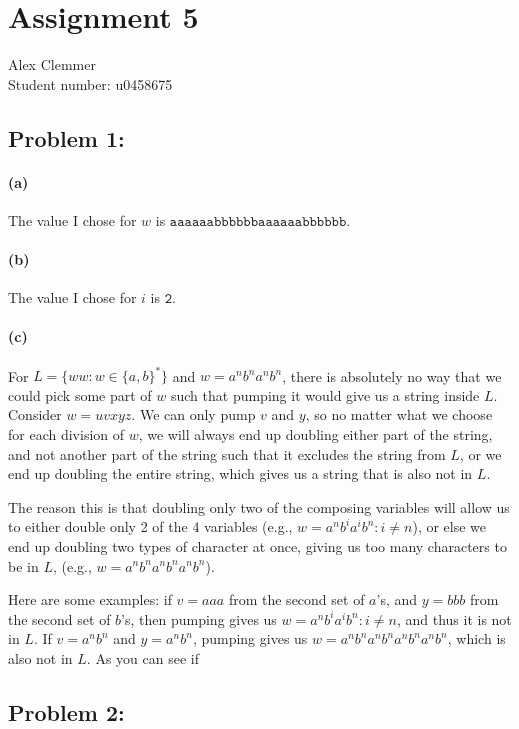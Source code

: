 \documentclass[a4paper]{article}
\begin{document}
\section*{Assignment 5}
Alex Clemmer\\
Student number: u0458675

\subsection*{Problem 1:} 

\paragraph{(a)} The value I chose for $w$ is $\texttt{aaaaaabbbbbbaaaaaabbbbbb}$.

\paragraph{(b)} The value I chose for $i$ is $\texttt{2}$.

\paragraph{(c)} For $L= \{ww : w \in \{a,b\}^*\}$ and $w = a^n b^n a^n b^n$, there is absolutely no way that we could pick some part of $w$ such that pumping it would give us a string inside $L$. Consider $w=uvxyz$. We can only pump $v$ and $y$, so no matter what we choose for each division of $w$, we will always end up doubling either part of the string, and not another part of the string such that it excludes the string from $L$, or we end up doubling the entire string, which gives us a string that is also not in $L$.

The reason this is that doubling only two of the composing variables will allow us to either double only 2 of the 4 variables (e.g., $w = a^n b^i a^i b^n : i \neq n$), or else we end up doubling two types of character at once, giving us too many characters to be in $L$, (e.g., $w = a^n b^n a^n b^n a^n b^n$).

Here are some examples: if $v= aaa$ from the second set of $a$'s, and $y=bbb$ from the second set of $b$'s, then pumping gives us $w = a^n b^i a^i b^n : i \neq n$, and thus it is not in $L$. If $v = a^n b^n$ and $y= a^n b^n$, pumping gives us $w= a^n b^n a^n b^n  a^n b^n  a^n b^n$, which is also not in $L$. As you can see if 

\subsection*{Problem 2:} 
\end{document}

